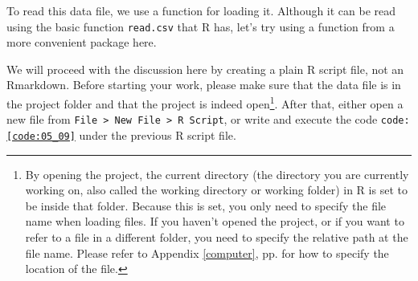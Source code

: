 \documentclass{ltjsbook}
\begin{document}
To read this data file, we use a function for loading it. Although it can be read using the basic function \texttt{read.csv} that R has, let's try using a function from a more convenient package here.

We will proceed with the discussion here by creating a plain R script file, not an Rmarkdown.
Before starting your work, please make sure that the data file is in the project folder and that the project is indeed open\footnote{By opening the project, the current directory (the directory you are currently working on, also called the working directory or working folder) in R is set to be inside that folder. Because this is set, you only need to specify the file name when loading files. If you haven't opened the project, or if you want to refer to a file in a different folder, you need to specify the relative path at the file name. Please refer to Appendix \ref{computer}, pp.\pageref{setLocation} for how to specify the location of the file.}. After that, either open a new file from \verb|File > New File > R Script|, or write and execute the code \texttt{code:\ref{code:05_09}} under the previous R script file.




\end{document}
